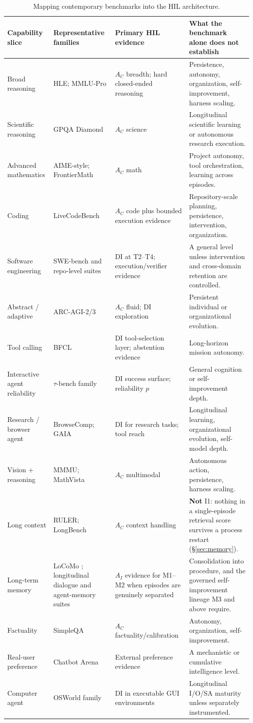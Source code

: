 \documentclass[11pt]{article}
\theoremstyle{definition}
\begin{document}
\begin{table}[H]
\centering\scriptsize
\begin{tabularx}{\textwidth}{@{}lZZZ@{}}
\toprule
Capability slice & Representative families & Primary HIL evidence & What the benchmark alone does not establish \\
\midrule
Broad reasoning & HLE; MMLU-Pro & $A_C$ breadth; hard closed-ended reasoning & Persistence, autonomy, organization, self-improvement, harness scaling. \\
Scientific reasoning & GPQA Diamond & $A_C$ science & Longitudinal scientific learning or autonomous research execution. \\
Advanced mathematics & AIME-style; FrontierMath & $A_C$ math & Project autonomy, tool orchestration, learning across episodes. \\
Coding & LiveCodeBench & $A_C$ code plus bounded execution evidence & Repository-scale planning, persistence, intervention, organization. \\
Software engineering & SWE-bench and repo-level suites & DI at T2--T4; execution/verifier evidence & A general level unless intervention and cross-domain retention are controlled. \\
Abstract / adaptive & ARC-AGI-2/3 & $A_C$ fluid; DI exploration & Persistent individual or organizational evolution. \\
Tool calling & BFCL & DI tool-selection layer; abstention evidence & Long-horizon mission autonomy. \\
Interactive agent reliability & $\tau$-bench family & DI success surface; reliability $p$ & General cognition or self-improvement depth. \\
Research / browser agent & BrowseComp; GAIA & DI for research tasks; tool reach & Longitudinal learning, organizational evolution, self-model depth. \\
Vision + reasoning & MMMU; MathVista & $A_C$ multimodal & Autonomous action, persistence, harness scaling. \\
Long context & RULER; LongBench & $A_C$ context handling & \textbf{Not} I1: nothing in a single-episode retrieval score survives a process restart (\S\ref{sec:memory}). \\
Long-term memory & LoCoMo \citep{maharana2024locomo}; longitudinal dialogue and agent-memory suites & $A_I$ evidence for M1--M2 when episodes are genuinely separated & Consolidation into procedure, and the governed self-improvement lineage M3 and above require. \\
Factuality & SimpleQA & $A_C$ factuality/calibration & Autonomy, organization, self-improvement. \\
Real-user preference & Chatbot Arena & External preference evidence & A mechanistic or cumulative intelligence level. \\
Computer agent & OSWorld family & DI in executable GUI environments & Longitudinal I/O/SA maturity unless separately instrumented. \\
\bottomrule
\end{tabularx}
\caption{Mapping contemporary benchmarks into the HIL architecture.}
\label{tab:mapping}
\end{table}
\end{document}
